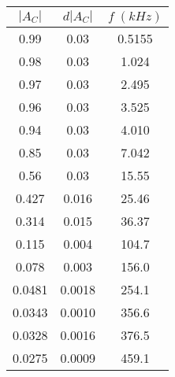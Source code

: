 \begin{tabular}{cc|c}
\toprule
$|A_{C}|$ & $d|A_{C}|$ & $f \; (kHz)$ \\
\midrule
     0.99 &       0.03 &       0.5155 \\
     0.98 &       0.03 &        1.024 \\
     0.97 &       0.03 &        2.495 \\
     0.96 &       0.03 &        3.525 \\
     0.94 &       0.03 &        4.010 \\
     0.85 &       0.03 &        7.042 \\
     0.56 &       0.03 &        15.55 \\
    0.427 &      0.016 &        25.46 \\
    0.314 &      0.015 &        36.37 \\
    0.115 &      0.004 &        104.7 \\
    0.078 &      0.003 &        156.0 \\
   0.0481 &     0.0018 &        254.1 \\
   0.0343 &     0.0010 &        356.6 \\
   0.0328 &     0.0016 &        376.5 \\
   0.0275 &     0.0009 &        459.1 \\
\bottomrule
\end{tabular}
